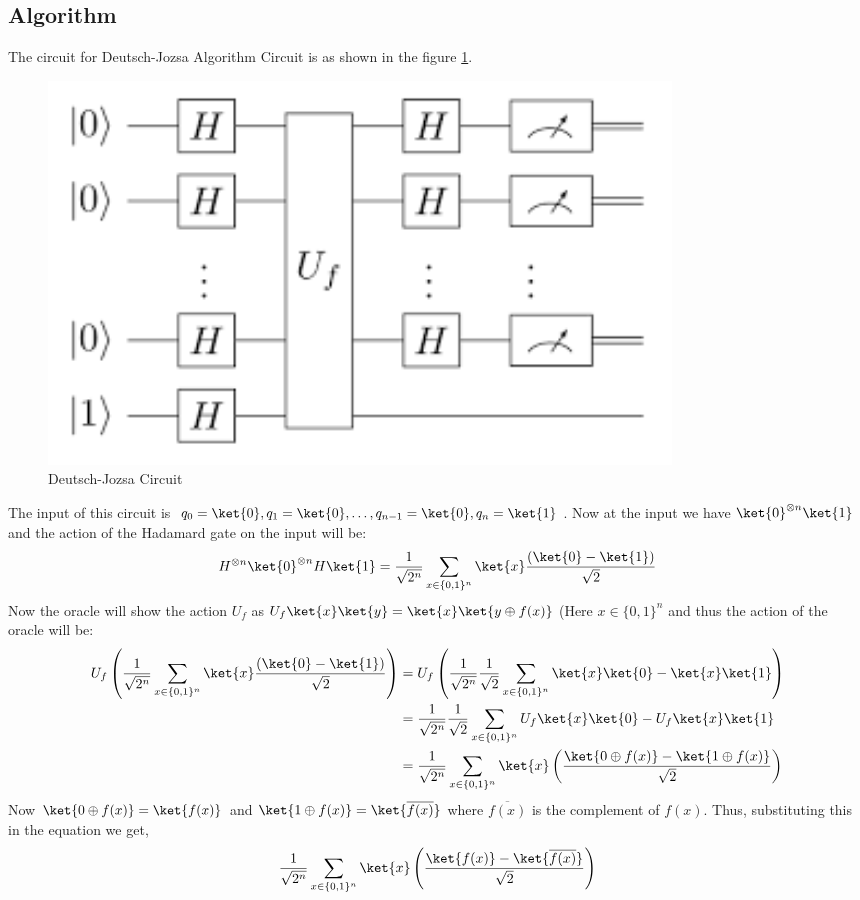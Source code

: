 \documentclass[12pt, oneside]{book}
\theoremstyle{definition}
\theoremstyle{definition}
\theoremstyle{remark}
\begin{document}
\subsection{Algorithm}

The circuit for Deutsch-Jozsa Algorithm Circuit is as shown in the figure \ref{fig:deutsch-jozsa}.
\begin{figure}[H]
    \centering
    \includegraphics[width=0.8\textwidth]{../images/Deutsch-Jozsa.png}
    \caption{Deutsch-Jozsa Circuit}
    \label{fig:deutsch-jozsa}
\end{figure}
The input of this circuit is $q_0=\ket{0},q_1=\ket{0},\ldots,q_{n-1}=\ket{0}, q_n=\ket{1}$.
Now at the input we have $\ket{0}^{\otimes n}\ket{1}$ and the action of the Hadamard gate on the input will be:
\[
    H^{\otimes n}\ket{0}^{\otimes n}H\ket{1}=\frac{1}{\sqrt{2^n}}\sum_{x \in \{0,1\}^n}\ket{x}\frac{(\ket{0}-\ket{1})}{\sqrt{2}}
\]
Now the oracle will show the action $U_f$ as $U_f\ket{x}\ket{y}=\ket{x}\ket{y \oplus f(x)}$ (Here $x \in \{0,1\}^n$ and thus the action of the oracle will be:
\begin{align*}
    U_f\left(\frac{1}{\sqrt{2^n}}\sum_{x \in \{0,1\}^n}\ket{x}\frac{(\ket{0}-\ket{1})}{\sqrt{2}}\right)&=U_f\left(\frac{1}{\sqrt{2^n}}\frac{1}{\sqrt{2}}\sum_{x \in \{0,1\}^n}\ket{x}\ket{0}-\ket{x}\ket{1}\right)\\
    &=\frac{1}{\sqrt{2^n}}\frac{1}{\sqrt{2}}\sum_{x \in \{0,1\}^n}U_f\ket{x}\ket{0}-U_f\ket{x}\ket{1}\\
    &=\frac{1}{\sqrt{2^n}}\sum_{x \in \{0,1\}^n}\ket{x}\left(\frac{\ket{0 \oplus f(x)}-\ket{1\oplus f(x)}}{\sqrt{2}}\right)
\end{align*}
Now $\ket{0 \oplus f(x)}=\ket{f(x)}$ and $\ket{1 \oplus f(x)} = \ket{\overline{f(x)}}$ where $\overline{f(x)}$ is the complement of $f(x)$. Thus, substituting this in the equation we get,
\[
    \frac{1}{\sqrt{2^n}}\sum_{x \in \{0,1\}^n}\ket{x}\left(\frac{\ket{f(x)}-\ket{\overline{f(x)}}}{\sqrt{2}}\right)
\] 
\end{document}
